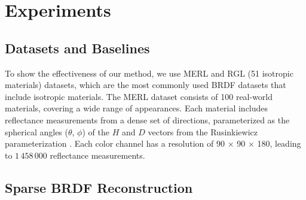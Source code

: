 \section{Experiments}\label{sec:exp}


\subsection{Datasets and Baselines}

To show the effectiveness of our method, we use MERL \cite{Matusik2003jul} and RGL (51 isotropic materials) \cite{dupuy2018adaptive} datasets, which are the most commonly used BRDF datasets that include isotropic materials. The MERL dataset \cite{Matusik2003jul} consists of 100 real-world materials, covering a wide range of appearances. Each material includes reflectance measurements from a dense set of directions, parameterized as the spherical angles ($\theta$, $\phi$) of the $H$ and $D$ vectors from the Rusinkiewicz parameterization \cite{rusinkiewicz1998new}. Each color channel has a resolution of 90 × 90 × 180, leading to $1\,458\,000$ reflectance measurements. 



\subsection{Sparse BRDF Reconstruction}\label{sec:brdf_rec}

